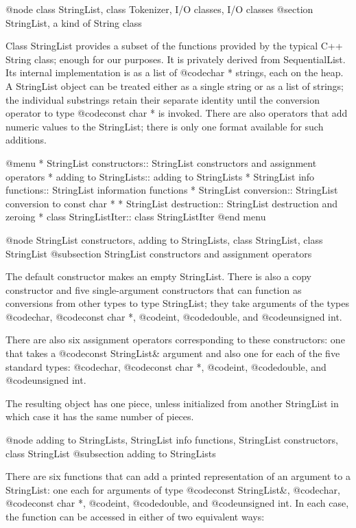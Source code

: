 @node class StringList, class Tokenizer, I/O classes, I/O classes
@section StringList, a kind of String class

Class StringList provides a subset of the functions provided by the
typical C++ String class; enough for our purposes.  It is privately
derived from SequentialList.  Its internal implementation is as a
list of @code{char *} strings, each on the heap.  A StringList
object can be treated either as a single string or as a list of
strings; the individual substrings retain their separate identity
until the conversion operator to type @code{const char *} is invoked.
There are also operators that add numeric values to the StringList;
there is only one format available for such additions.

@menu
* StringList constructors::     StringList constructors and assignment operators
* adding to StringLists::       adding to StringLists
* StringList info functions::   StringList information functions
* StringList conversion::       StringList conversion to const char *
* StringList destruction::      StringList destruction and zeroing
* class StringListIter::        class StringListIter
@end menu

@node StringList constructors, adding to StringLists, class StringList, class StringList
@subsection StringList constructors and assignment operators

The default constructor makes an empty StringList.  There is also
a copy constructor and five single-argument constructors that can
function as conversions from other types to type StringList; they
take arguments of the types
@code{char}, @code{const char *}, @code{int}, @code{double}, and
@code{unsigned int}.

There are also six assignment operators corresponding to these
constructors: one that takes a @code{const StringList&} argument and
also one for each of the five standard types:
@code{char}, @code{const char *}, @code{int}, @code{double}, and
@code{unsigned int}.

The resulting object has one piece, unless initialized from another
StringList in which case it has the same number of pieces.

@node adding to StringLists, StringList info functions, StringList constructors, class StringList
@subsection adding to StringLists

There are six functions that can add a printed representation of an
argument to a StringList: one each for arguments of type
@code{const StringList&}, @code{char}, @code{const char *}, @code{int},
@code{double}, and @code{unsigned int}.  In each case, the function
can be accessed in either of two equivalent ways:

